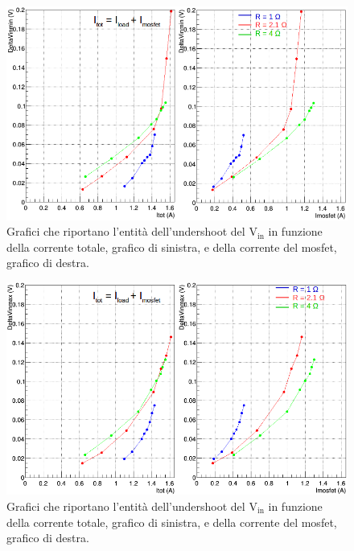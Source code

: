 \begin{figure}
\centering
\includegraphics[width=0.9\linewidth]{Immagini/VinUnd}
\caption{Grafici che riportano l'entità dell'undershoot del $\mathrm{V_{in}}$ in funzione della corrente totale, grafico di sinistra, e della corrente del mosfet, grafico di destra.}
\label{VinUnd}
\end{figure}

\begin{figure}
\centering
\includegraphics[width=0.9\linewidth]{Immagini/VinOver}
\caption{Grafici che riportano l'entità dell'undershoot del $\mathrm{V_{in}}$ in funzione della corrente totale, grafico di sinistra, e della corrente del mosfet, grafico di destra.}
\label{VinOver}
\end{figure}

